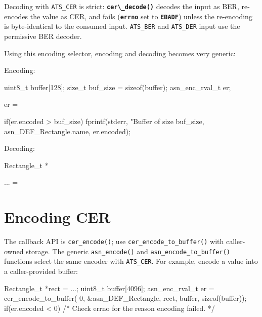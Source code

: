\documentclass[english,oneside,12pt]{book}
\newcommand{\code}[1]{\texttt{\textbf{\lstinline{#1}}}}
\begin{document}
Decoding with \texttt{ATS\_CER} is strict: \code{cer\_decode()} decodes the
input as BER, re-encodes the value as CER, and fails (\code{errno} set to
\code{EBADF}) unless the re-encoding is byte-identical to the consumed input.
\texttt{ATS\_BER} and \texttt{ATS\_DER} input use the permissive BER decoder.

Using this encoding selector, encoding and decoding becomes very generic:

\noindent{}Encoding:

\begin{codesample}[basicstyle=\scriptsize\listingfont]
uint8_t buffer[128];
size_t buf_size = sizeof(buffer);
asn_enc_rval_t er;

er = %

if(er.encoded > buf_size) {
    fprintf(stderr, "Buffer of size %
        buf_size, asn_DEF_Rectangle.name, er.encoded);
}
\end{codesample}

\noindent{}Decoding:

\begin{codesample}[basicstyle=\scriptsize\listingfont]
Rectangle_t *%

... = %
\end{codesample}

\section{\label{sec:Encoding-CER}Encoding CER}

The callback API is \texttt{cer\_encode()}; use
\texttt{cer\_encode\_to\_buffer()} with caller-owned storage. The generic
\texttt{asn\_encode()} and \texttt{asn\_encode\_to\_buffer()} functions select
the same encoder with \texttt{ATS\_CER}.
For example, encode a value into a caller-provided buffer:

\begin{codesample}[basicstyle=\scriptsize\listingfont]
Rectangle_t *rect = ...;
uint8_t buffer[4096];
asn_enc_rval_t er = cer_encode_to_buffer(
    0, &asn_DEF_Rectangle, rect, buffer, sizeof(buffer));
if(er.encoded < 0) {
    /* Check errno for the reason encoding failed. */
}
\end{codesample}
\end{document}
